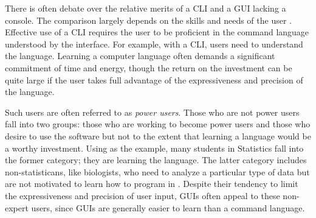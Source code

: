 \documentclass[article]{jss}
\begin{document}
There is often debate over the relative merits of a CLI and a GUI lacking a console. 
The comparison largely
depends on the skills and needs of the user \citep{gui-cli}. Effective use of a
CLI requires the user to be proficient in the command language understood by the
interface. For example, with a CLI,  users need to understand the 
 language. Learning a computer language often demands a significant
commitment of time and energy, though the return on the investment can be quite
large if the user takes full advantage of the expressiveness and precision of 
the language.

Such users are often referred to as \emph{power users}. Those who 
are not power users fall into two groups: those who are working to become power
users and those who desire to use the software but not to the extent that learning a
language would be a worthy investment. Using
 as the example, many students in Statistics fall into the former 
category; they are learning the  language. The latter category includes 
non-statisticans, like biologists, who need to analyze a particular
type of data but are not motivated to learn how to program in . 
Despite their tendency to limit the expressiveness and precision of user input, 
GUIs often appeal to these non-expert users, since GUIs are generally easier
to learn than a command language.
\end{document}
